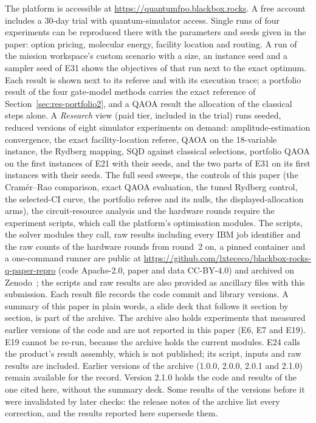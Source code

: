 \documentclass[11pt,a4paper]{article}
\begin{document}
The platform is accessible at \url{https://quantumfpo.blackbox.rocks}. A free
account includes a 30-day trial with quantum-simulator access. Single runs of
four experiments can be reproduced there with the parameters and seeds given
in the paper: option pricing, molecular energy, facility location and
routing. A run of the mission workspace's custom scenario with a size, an
instance seed and a sampler seed of E31 shows the objectives of that run next
to the exact optimum. Each result is shown next to its referee and with its execution
trace; a portfolio result of the four gate-model methods carries the exact
reference of Section~\ref{sec:res-portfolio2}, and a QAOA result the
allocation of the classical steps alone. A \emph{Research} view (paid tier, included in the trial) runs seeded,
reduced versions of eight simulator experiments on demand: amplitude-estimation
convergence, the exact facility-location referee, QAOA on the 18-variable
instance, the Rydberg mapping, SQD against classical selections,
portfolio QAOA on the first instances of E21 with their seeds, and the two
parts of E31 on its first instances with their seeds. The full
seed sweeps, the controls of this paper (the Cram\'er--Rao comparison,
exact QAOA evaluation, the tuned Rydberg control, the selected-CI curve, the
portfolio referee and its nulls, the displayed-allocation arms), the circuit-resource analysis and the
hardware rounds require the experiment
scripts, which call the platform's optimisation modules. The scripts, the
solver modules they call, raw results including every IBM job identifier and
the raw counts of the hardware rounds from round~2 on, a pinned container and a one-command runner are
public at \url{https://github.com/lxtececo/blackbox-rocks-q-paper-repro}
(code Apache-2.0, paper and data CC-BY-4.0) and archived on
Zenodo~\cite{repro2026}; the scripts and raw results are also provided as
ancillary files with this
submission. Each result file records the code commit and library versions.
A summary of this paper in plain words, a slide deck that follows it
section by section, is part of the archive.
The archive also holds experiments that measured earlier versions of the
code and are not reported in this paper (E6, E7 and E19). E19 cannot be
re-run, because the archive holds the current modules. E24
calls the product's result assembly, which is not published; its script,
inputs and raw results are included.
Earlier versions of the archive (1.0.0, 2.0.0, 2.0.1 and 2.1.0) remain
available for the record. Version 2.1.0 holds the code and results of the
one cited here, without the summary deck. Some results of the versions
before it were
invalidated by later checks: the
release notes of the archive list every correction, and the results
reported here supersede them.
\end{document}
